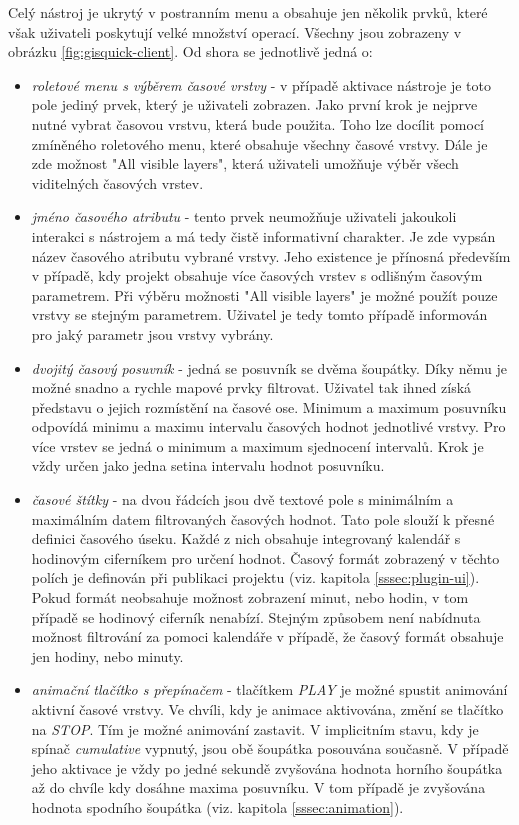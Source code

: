 Celý nástroj je ukrytý v postranním menu a obsahuje jen několik prvků,
které však uživateli poskytují velké množství operací. Všechny
jsou zobrazeny v obrázku \ref{fig:gisquick-client}. Od shora se jednotlivě
jedná o:

\begin{itemize}
\item\textit{roletové menu s výběrem časové vrstvy} - v
případě aktivace nástroje je toto pole jediný prvek, který
je uživateli zobrazen. Jako první krok je nejprve nutné vybrat
časovou vrstvu, která bude použita. Toho lze docílit pomocí
zmíněného roletového menu, které obsahuje všechny časové
vrstvy. Dále je zde možnost "All visible layers", která uživateli
umožňuje výběr všech viditelných časových vrstev.
\item\textit{jméno časového atributu} - tento prvek neumožňuje
uživateli jakoukoli interakci s nástrojem a má tedy čistě
informativní charakter. Je zde vypsán název časového atributu
vybrané vrstvy. Jeho existence je přínosná především v
případě, kdy projekt obsahuje více časových vrstev s odlišným
časovým parametrem. Při výběru možnosti "All visible layers" je
možné použít pouze vrstvy se stejným parametrem. Uživatel je tedy
tomto případě informován pro jaký parametr jsou vrstvy vybrány.
\item\textit{dvojitý časový posuvník} - jedná se posuvník
se dvěma
šoupátky. Díky němu je možné snadno a rychle mapové
prvky filtrovat. Uživatel tak ihned získá představu o jejich
rozmístění na časové ose. Minimum a maximum posuvníku odpovídá
minimu a maximu intervalu časových hodnot jednotlivé vrstvy. Pro
více vrstev se jedná o minimum a maximum sjednocení intervalů. Krok
je vždy určen jako jedna setina intervalu hodnot posuvníku.
\item\textit{časové štítky} - na dvou řádcích jsou dvě
textové pole s minimálním a maximálním datem filtrovaných
časových hodnot. Tato pole slouží k přesné definici
časového úseku. Každé z nich obsahuje integrovaný kalendář
s hodinovým ciferníkem pro určení hodnot. Časový formát
zobrazený v těchto polích je definován při publikaci projektu
(viz. kapitola \ref{sssec:plugin-ui}). Pokud formát neobsahuje
možnost zobrazení minut, nebo hodin, v tom případě se hodinový
ciferník nenabízí. Stejným způsobem není nabídnuta možnost
filtrování za pomoci kalendáře v případě, že časový formát
obsahuje jen hodiny, nebo minuty.
\item\textit{animační tlačítko s přepínačem} - tlačítkem \textit{PLAY}
je možné spustit animování aktivní časové vrstvy.  Ve chvíli, kdy je
animace aktivována, změní se tlačítko na \textit{STOP}. Tím je možné
animování zastavit. V implicitním stavu, kdy je
spínač \textit{cumulative} vypnutý, jsou obě šoupátka posouvána
současně. V případě jeho aktivace je vždy po jedné sekundě zvyšována
hodnota horního šoupátka až do chvíle kdy dosáhne maxima posuvníku. V
tom případě je zvyšována hodnota spodního šoupátka
(viz. kapitola \ref{sssec:animation}).
\end{itemize}

